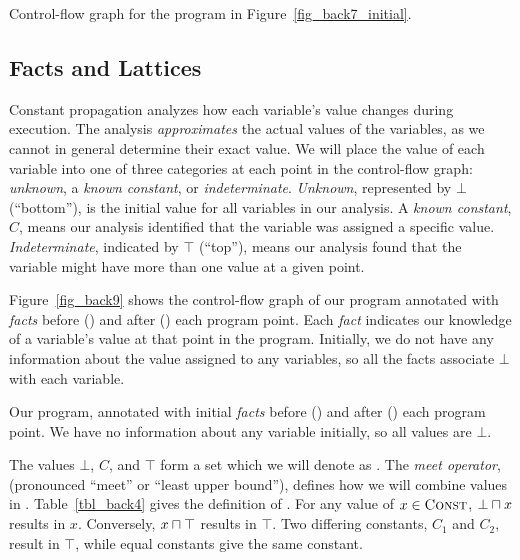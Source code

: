 \documentclass[12pt]{report}
\begin{document}
\begin{myfig}[tbh]
  
  \caption{Control-flow graph for the program in
    Figure~\ref{fig_back7_initial}.}
  \label{fig_back8}
\end{myfig}

\subsection{Facts and Lattices} 
\label{back_subsec_facts}

Constant propagation analyzes how each variable's value changes during
execution. The analysis \emph{approximates} the actual values of the
variables, as we cannot in general determine their exact value. We
will place the value of each variable into one of three categories at
each point in the control-flow graph: \emph{unknown}, a \emph{known
  constant}, or \emph{indeterminate}. \emph{Unknown}, represented by
$\bot$ (``bottom''), is the initial value for all variables in our
analysis. A \emph{known constant}, $C$, means our analysis identified
that the variable was assigned a specific value. \emph{Indeterminate},
indicated by $\top$ (``top''), means our analysis found that the
variable might have more than one value at a given point.

Figure~\ref{fig_back9} shows the control-flow graph of our program
annotated with \emph{facts} before (\inE) and after (\out) each
program point. Each \emph{fact} indicates our knowledge
of a variable's value at that point in the program. Initially, we
do not have any information about the value assigned to any variables,
so all the facts associate $\bot$ with each variable. 

\begin{myfig}
  
  \caption{Our program, annotated with initial \emph{facts} before
    (\inE) and after (\out) each program point. We have no information
    about any variable initially, so all values are $\bot$.}
  \label{fig_back9}
\end{myfig}

The values $\bot$, $C$, and $\top$ form a set which we
will denote as \setLC. The \emph{meet operator}, \lub (pronounced ``meet'' or
``least upper bound''), defines how we will combine values in
\setLC. Table~\ref{tbl_back4} gives the definition of \lub. For any
value of $x \in \textsc{Const}$, $\bot \lub x$ results in $x$. Conversely, $x
\lub \top$ results in $\top$. Two differing constants, $C_1$ and
$C_2$, result in $\top$, while equal constants give the same constant.
\end{document}
